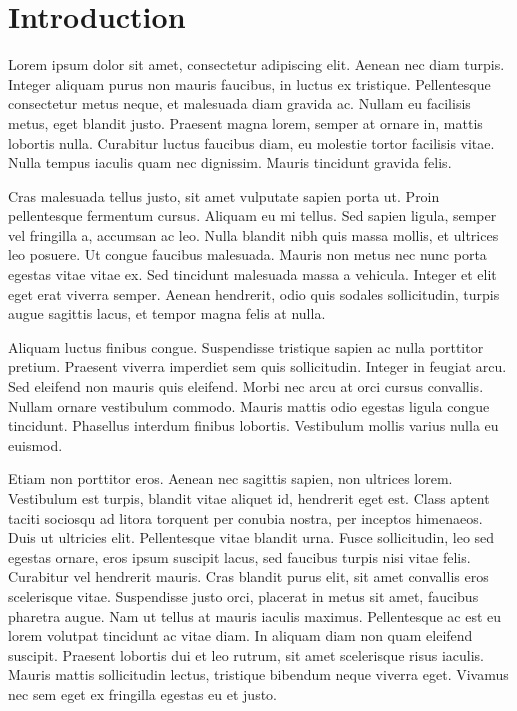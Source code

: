\chapter{Introduction}

Lorem ipsum dolor sit amet, consectetur adipiscing elit. Aenean nec diam turpis. Integer aliquam purus non mauris faucibus, in luctus ex tristique. Pellentesque consectetur metus neque, et malesuada diam gravida ac. Nullam eu facilisis metus, eget blandit justo. Praesent magna lorem, semper at ornare in, mattis lobortis nulla. Curabitur luctus faucibus diam, eu molestie tortor facilisis vitae. Nulla tempus iaculis quam nec dignissim. Mauris tincidunt gravida felis.

Cras malesuada tellus justo, sit amet vulputate sapien porta ut. Proin pellentesque fermentum cursus. Aliquam eu mi tellus. Sed sapien ligula, semper vel fringilla a, accumsan ac leo. Nulla blandit nibh quis massa mollis, et ultrices leo posuere. Ut congue faucibus malesuada. Mauris non metus nec nunc porta egestas vitae vitae ex. Sed tincidunt malesuada massa a vehicula. Integer et elit eget erat viverra semper. Aenean hendrerit, odio quis sodales sollicitudin, turpis augue sagittis lacus, et tempor magna felis at nulla.

Aliquam luctus finibus congue. Suspendisse tristique sapien ac nulla porttitor pretium. Praesent viverra imperdiet sem quis sollicitudin. Integer in feugiat arcu. Sed eleifend non mauris quis eleifend. Morbi nec arcu at orci cursus convallis. Nullam ornare vestibulum commodo. Mauris mattis odio egestas ligula congue tincidunt. Phasellus interdum finibus lobortis. Vestibulum mollis varius nulla eu euismod.

Etiam non porttitor eros. Aenean nec sagittis sapien, non ultrices lorem. Vestibulum est turpis, blandit vitae aliquet id, hendrerit eget est. Class aptent taciti sociosqu ad litora torquent per conubia nostra, per inceptos himenaeos. Duis ut ultricies elit. Pellentesque vitae blandit urna. Fusce sollicitudin, leo sed egestas ornare, eros ipsum suscipit lacus, sed faucibus turpis nisi vitae felis. Curabitur vel hendrerit mauris. Cras blandit purus elit, sit amet convallis eros scelerisque vitae. Suspendisse justo orci, placerat in metus sit amet, faucibus pharetra augue. Nam ut tellus at mauris iaculis maximus. Pellentesque ac est eu lorem volutpat tincidunt ac vitae diam. In aliquam diam non quam eleifend suscipit. Praesent lobortis dui et leo rutrum, sit amet scelerisque risus iaculis. Mauris mattis sollicitudin lectus, tristique bibendum neque viverra eget. Vivamus nec sem eget ex fringilla egestas eu et justo.

